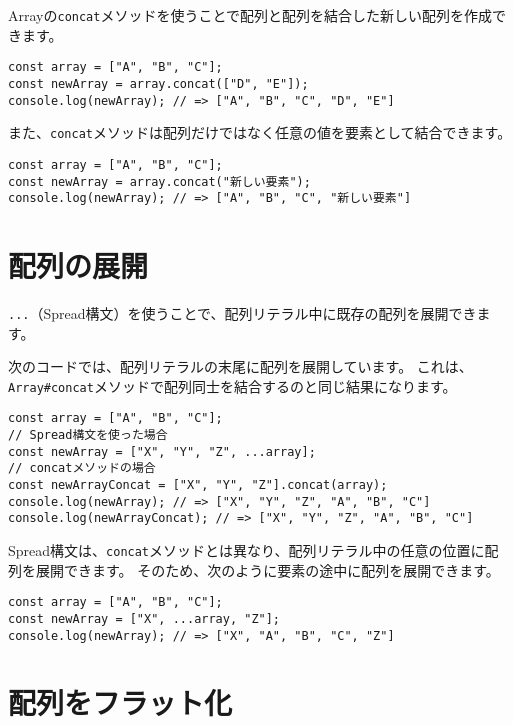 Arrayの\texttt{concat}メソッドを使うことで配列と配列を結合した新しい配列を作成できます。

\begin{lstlisting}
const array = ["A", "B", "C"];
const newArray = array.concat(["D", "E"]);
console.log(newArray); // => ["A", "B", "C", "D", "E"]
\end{lstlisting}

また、\texttt{concat}メソッドは配列だけではなく任意の値を要素として結合できます。

\begin{lstlisting}
const array = ["A", "B", "C"];
const newArray = array.concat("新しい要素");
console.log(newArray); // => ["A", "B", "C", "新しい要素"]
\end{lstlisting}

\hypertarget{spread}{%
\section[配列の展開]{配列の展開\,\protect{}}\label{spread}}

\texttt{...}（Spread構文）を使うことで、配列リテラル中に既存の配列を展開できます。

次のコードでは、配列リテラルの末尾に配列を展開しています。
これは、\texttt{Array\#concat}メソッドで配列同士を結合するのと同じ結果になります。

\begin{lstlisting}
const array = ["A", "B", "C"];
// Spread構文を使った場合
const newArray = ["X", "Y", "Z", ...array];
// concatメソッドの場合
const newArrayConcat = ["X", "Y", "Z"].concat(array);
console.log(newArray); // => ["X", "Y", "Z", "A", "B", "C"]
console.log(newArrayConcat); // => ["X", "Y", "Z", "A", "B", "C"]
\end{lstlisting}

Spread構文は、\texttt{concat}メソッドとは異なり、配列リテラル中の任意の位置に配列を展開できます。
そのため、次のように要素の途中に配列を展開できます。

\begin{lstlisting}
const array = ["A", "B", "C"];
const newArray = ["X", ...array, "Z"];
console.log(newArray); // => ["X", "A", "B", "C", "Z"]
\end{lstlisting}

\hypertarget{flat}{%
\section[配列をフラット化]{配列をフラット化\,\protect{}}\label{flat}}

